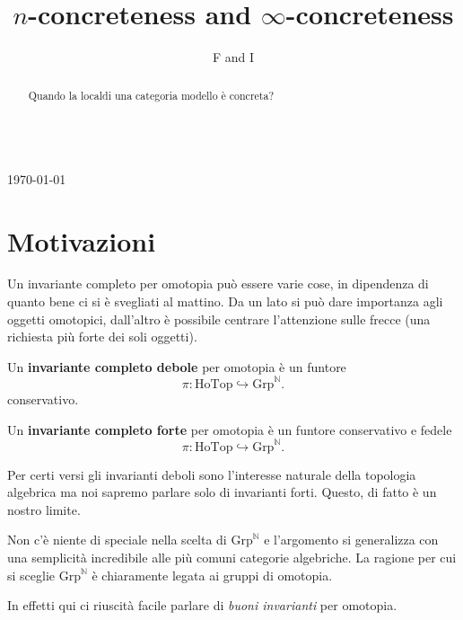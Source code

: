 \documentclass[10pt,a4paper]{amsart}
\author{F and I}
\title{$n$-concreteness and $\infty$-concreteness}
\begin{document}
\maketitle

\begin{abstract}
Quando la local\izzazione di una categoria modello è concreta?
\end{abstract}

\tableofcontents


\noindent\hrulefill\\
{\color{red}\currenttime \hspace*{\fill} \today}\newline
\noindent\hrulefill

\section{Motivazioni}

\epigraph{}{}

Un invariante completo per omotopia può essere varie cose, in dipendenza di quanto bene ci si è svegliati al mattino. Da un lato si può dare importanza agli oggetti omotopici, dall'altro è possibile centrare l'attenzione sulle frecce (una richiesta più forte dei soli oggetti).

\begin{definition}
Un \textbf{invariante completo debole} per omotopia è un funtore $$\pi : \text{HoTop} \hookrightarrow \text{Grp}^\mathbb{N}.$$ conservativo.
\end{definition}

\begin{definition}
Un \textbf{invariante completo forte} per omotopia è un funtore conservativo e fedele $$\pi : \text{HoTop} \hookrightarrow \text{Grp}^\mathbb{N}.$$
\end{definition}

Per certi versi gli invarianti deboli sono l'interesse naturale della topologia algebrica ma noi sapremo parlare solo di invarianti forti. Questo, di fatto è un nostro limite. 

Non c'è niente di speciale nella scelta di  $\text{Grp}^\mathbb{N}$ e l'argomento si generalizza con una semplicità incredibile alle più comuni categorie algebriche. La ragione per cui si sceglie $\text{Grp}^\mathbb{N}$ è chiaramente legata ai gruppi di omotopia. \newline

In effetti qui ci riuscità facile parlare di \textit{buoni invarianti} per omotopia.
\end{document}
